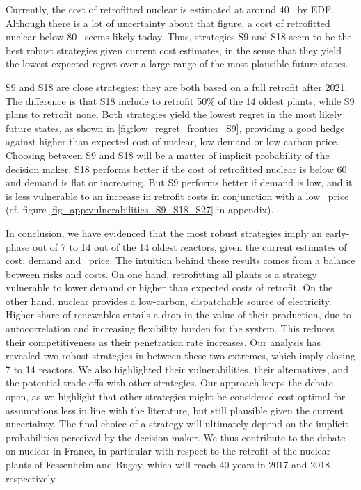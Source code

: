 Currently, the cost of retrofitted nuclear is estimated at around 40 \emwh\ by EDF. Although there is a lot of uncertainty about that figure, a cost of retrofitted nuclear below 80 \emwh\ seems likely today. Thus, strategies S9 and S18 seem to be the best robust strategies given current cost estimates, in the sense that they yield the lowest expected regret over a large range of the most plausible future states.

S9 and S18 are close strategies: they are both based on a full retrofit after 2021. The difference is that S18 include to retrofit 50\% of the 14 oldest plants, while S9 plans to retrofit none. 
Both strategies yield the lowest regret in the most likely future states, as shown in \ref{fig:low_regret_frontier_S9}, providing a good hedge against higher than expected cost of nuclear, low demand or low carbon price. 
Choosing between S9 and S18 will be a matter of implicit probability of the decision maker. S18 performs better if the cost of retrofitted nuclear is below 60 \emwh~ and demand is flat or increasing. But S9 performs better if demand is low, and it is less vulnerable to an increase in retrofit costs in conjunction with a low \coo\ price (cf. figure \ref{fig_app:vulnerabilities_S9_S18_S27} in appendix).

In conclusion, we have evidenced that the most robust strategies imply an early-phase out of 7 to 14 out of the 14 oldest reactors, given the current estimates of cost, demand and \coo\ price. The intuition behind these results comes from a balance between risks and costs. On one hand, retrofitting all plants is a strategy vulnerable to lower demand or higher than expected costs of retrofit. On the other hand, nuclear provides a low-carbon, dispatchable source of electricity. Higher share of renewables entails a drop in the value of their production, due to autocorrelation and increasing flexibility burden for the system. This reduces their competitiveness as their penetration rate increases. Our analysis has revealed two robust strategies in-between these two extremes, which imply closing 7 to 14 reactors. 
We also highlighted their vulnerabilities, their alternatives, and the potential trade-offs with other strategies. Our approach keeps the debate open, as we highlight that other strategies might be considered cost-optimal for assumptions less in line with the literature, but still plausible given the current uncertainty. 
The final choice of a strategy will ultimately depend on the implicit probabilities perceived by the decision-maker. We thus contribute to the debate on nuclear in France, in particular with respect to the retrofit of the nuclear plants of Fessenheim and Bugey, which will reach 40 years in 2017 and 2018 respectively.


